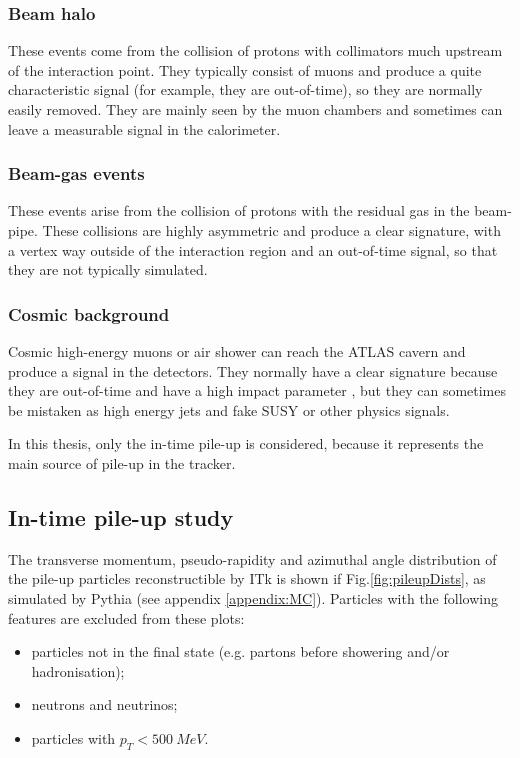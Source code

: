 \documentclass[a4paper,twoside,12pt]{article}
\begin{document}
\subsubsection*{Beam halo}
These events come from the collision of protons with collimators much upstream of the 
interaction point. They typically consist of muons and produce a quite characteristic signal (for example, they are out-of-time), so they are normally easily removed. They are mainly seen by the muon chambers and sometimes
can leave a measurable signal in the calorimeter\cite{ATLAS_pileup}. 

\subsubsection*{Beam-gas events}
These events arise from the collision of protons with the residual gas in the beam-pipe. These
collisions are highly asymmetric and produce a clear signature, with a vertex way outside of
the interaction region and an out-of-time signal, so that they are not typically simulated\cite{ATLAS_pileup}.

\subsubsection*{Cosmic background}
Cosmic high-energy muons or air shower can reach the ATLAS cavern and produce a signal in the detectors.
They normally have a clear signature because they are out-of-time and have a high impact
parameter , but they can sometimes
be mistaken as high energy jets and fake SUSY or other physics signals\cite{ATLAS_cosmic}. \\

\bigskip

In this thesis, only the in-time pile-up is considered, because it represents the main source of
pile-up in the tracker.

\subsection{In-time pile-up study}

The transverse momentum, pseudo-rapidity and azimuthal angle distribution of the pile-up particles reconstructible by ITk is shown if Fig.\ref{fig:pileupDists}, as simulated by 
Pythia (see appendix \ref{appendix:MC}). Particles with the following
features are excluded from these plots:

\begin{itemize}
\item particles not in the final state (e.g. partons before showering and/or hadronisation);
\item neutrons and neutrinos;
\item particles with $p_{T} < 500\ MeV$.
\end{itemize}
\end{document}
